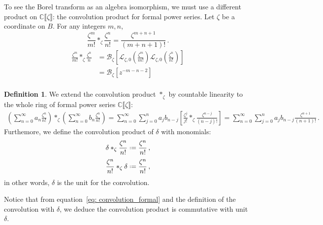 \documentclass{article}
\newcommand{\C}{\mathbb{C}}
\newcommand{\series}[1]{\tilde{#1}}
\newcommand*{\defeq}{\mathrel{\vcenter{\baselineskip0.5ex \lineskiplimit0pt
                     \hbox{\scriptsize.}\hbox{\scriptsize.}}}%
                     =}
\newcommand{\laplace}{\mathcal{L}}
\newcommand{\borel}{\mathcal{B}}
\theoremstyle{definition}
\newtheorem{definition}{Definition}[section]
\theoremstyle{plain}
\newenvironment{verify}{\color{ForestGreen}}{\color{black}}
\begin{document}
To see the Borel transform as an algebra isomorphism, we must use a different product on $\C\llbracket\zeta\rrbracket$: the convolution product for formal power series. Let $\zeta$ be a coordinate on $B$. For any integers $m, n$,%
\begin{equation}\label{eq: convolution_formal}
\frac{\zeta^m}{m!} \ast_{\zeta} \frac{\zeta^n}{n!} = \frac{\zeta^{m+n+1}}{(m+n+1)!} \,.
\end{equation}
\begin{verify}
\begin{align*}
\frac{\zeta^m}{m!} \ast_\zeta \frac{\zeta^n}{n} & = \borel_\zeta \left[ \laplace_{\zeta, 0}\left(\frac{\zeta^m}{m!}\right) \laplace_{\zeta, 0} \left(\frac{\zeta^n}{n!}\right) \right] \\
& = \borel_\zeta[z^{-m-n-2}] \\
\end{align*}
\end{verify}
\begin{definition}\label{def:convolution_formal}
We extend the convolution product $\ast_\zeta$ by countable linearity to the whole ring of formal power series $\C\llbracket\zeta\rrbracket$:
\begin{align*}
   \left( \sum_{n=0}^\infty a_n \frac{\zeta^n}{n!}\right)\ast_\zeta\left(\sum_{n=0}^\infty b_n\frac{\zeta^n}{n!}\right)=\sum_{n=0}^\infty\sum_{j=0}^na_jb_{n-j}\left[\frac{\zeta^j}{j!}\ast_\zeta\frac{\zeta^{n-j}}{(n-j)!}\right]=\sum_{n=0}^\infty\sum_{j=0}^na_jb_{n-j}\frac{\zeta^{n+1}}{(n+1)!}\,.
\end{align*}
Furthemore, we define the convolution product of $\delta$ with monomials: \[\delta\ast_{\zeta}\frac{\zeta^n}{n!}\defeq\frac{\zeta^n}{n!}\,,\]
\[\frac{\zeta^n}{n!}\ast_{\zeta}\delta\defeq\frac{\zeta^n}{n!}\,,\]
in other words, $\delta$ is the unit for the convolution. 
\end{definition}
Notice that from equation~\eqref{eq: convolution_formal} and the definition of the convolution with $\delta$, we deduce the convolution product is commutative with unit $\delta$.
\end{document}
